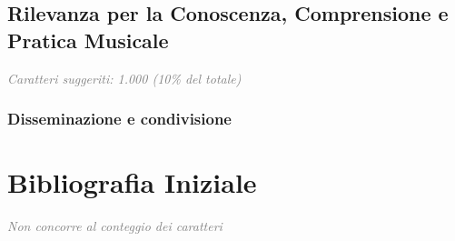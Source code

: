 \documentclass{gs-adonis}
\begin{document}
\subsection{Rilevanza per la Conoscenza, Comprensione e Pratica Musicale}
{\small\textcolor{gray}{\textit{Caratteri suggeriti: 1.000 (10\% del totale)}}}


\subsubsection{Disseminazione e condivisione}

\section*{Bibliografia Iniziale}
{\small\textcolor{gray}{\textit{Non concorre al conteggio dei caratteri}}}


\raggedright
\nocite{*}
\printbibliography

\end{document}
